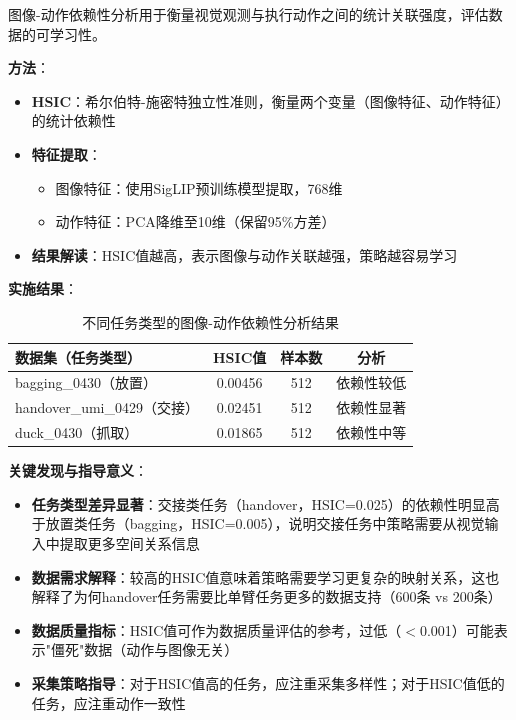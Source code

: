 图像-动作依赖性分析用于衡量视觉观测与执行动作之间的统计关联强度，评估数据的可学习性。

\textbf{方法}：
\begin{itemize}[leftmargin=2em]
    \item \textbf{HSIC}\cite{gretton2005hsic}：希尔伯特-施密特独立性准则，衡量两个变量（图像特征、动作特征）的统计依赖性
    \item \textbf{特征提取}：
    \begin{itemize}
        \item 图像特征：使用SigLIP\cite{siglip2023}预训练模型提取，768维
        \item 动作特征：PCA降维至10维（保留95\%方差）
    \end{itemize}
    \item \textbf{结果解读}：HSIC值越高，表示图像与动作关联越强，策略越容易学习
\end{itemize}

\textbf{实施结果}：

\begin{table}[htbp]
\centering
\caption{不同任务类型的图像-动作依赖性分析结果}
\label{tab:hsic_results}
\begin{tabular}{lccc}
\toprule
数据集（任务类型） & HSIC值 & 样本数 & 分析 \\
\midrule
bagging\_0430（放置） & 0.00456 & 512 & 依赖性较低 \\
handover\_umi\_0429（交接） & 0.02451 & 512 & 依赖性显著 \\
duck\_0430（抓取） & 0.01865 & 512 & 依赖性中等 \\
\bottomrule
\end{tabular}
\end{table}

\textbf{关键发现与指导意义}：
\begin{itemize}[leftmargin=2em]
    \item \textbf{任务类型差异显著}：交接类任务（handover，HSIC=0.025）的依赖性明显高于放置类任务（bagging，HSIC=0.005），说明交接任务中策略需要从视觉输入中提取更多空间关系信息
    \item \textbf{数据需求解释}：较高的HSIC值意味着策略需要学习更复杂的映射关系，这也解释了为何handover任务需要比单臂任务更多的数据支持（600条 vs 200条）
    \item \textbf{数据质量指标}：HSIC值可作为数据质量评估的参考，过低（$<$0.001）可能表示"僵死"数据（动作与图像无关）
    \item \textbf{采集策略指导}：对于HSIC值高的任务，应注重采集多样性；对于HSIC值低的任务，应注重动作一致性
\end{itemize}


